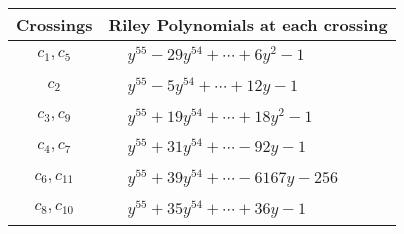 \documentclass[1p]{elsarticle_modified}
\theoremstyle{definition}
\begin{document}
\begin{tabular}{m{50pt}|m{274pt}}
Crossings & \hspace{64pt}Riley Polynomials at each crossing \\
\hline $$\begin{aligned}c_{1},c_{5}\end{aligned}$$&$\begin{aligned}
&y^{55}-29 y^{54}+\cdots+6 y^2-1
\end{aligned}$\\
\hline $$\begin{aligned}c_{2}\end{aligned}$$&$\begin{aligned}
&y^{55}-5 y^{54}+\cdots+12 y-1
\end{aligned}$\\
\hline $$\begin{aligned}c_{3},c_{9}\end{aligned}$$&$\begin{aligned}
&y^{55}+19 y^{54}+\cdots+18 y^2-1
\end{aligned}$\\
\hline $$\begin{aligned}c_{4},c_{7}\end{aligned}$$&$\begin{aligned}
&y^{55}+31 y^{54}+\cdots-92 y-1
\end{aligned}$\\
\hline $$\begin{aligned}c_{6},c_{11}\end{aligned}$$&$\begin{aligned}
&y^{55}+39 y^{54}+\cdots-6167 y-256
\end{aligned}$\\
\hline $$\begin{aligned}c_{8},c_{10}\end{aligned}$$&$\begin{aligned}
&y^{55}+35 y^{54}+\cdots+36 y-1
\end{aligned}$\\
\hline
\end{tabular}
\vskip 2pc
\end{document}
